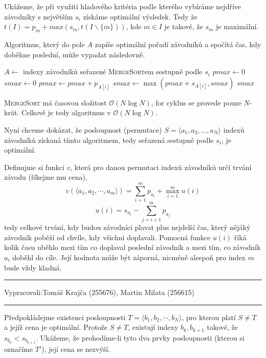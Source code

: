 \documentclass[12pt]{article}
\newcommand{\la}{\leftarrow}
\renewcommand{\O}{\mathcal{O}}
\newcommand{\zadani}[2]{
{\large
\noindent {\bf IB108 \hfill{} Sada #1, Příklad #2 \\[-4mm]}
\noindent\hrule
\vspace{2mm}
\noindent Vypracovali:\hfill{}Tomáš Krajča (255676), Martin Milata (256615)
\vspace{3mm}
\hrule
\bigskip\bigskip}
}
\begin{document}
Ukážeme, že při využití hladového kritéria podle kterého vybíráme nejdříve závodníky s největším
$s_i$ získáme optimální výsledek. Tedy že $t(I) = p_m + max(s_m, t(I \smallsetminus \{m\}))$, kde $m
\in I$ je takové, že $s_m$ je maximální.

Algoritmus, který do pole $A$ zapíše optimální pořadí závodníků a spočítá čas, kdy doběhne poslední,
může vypadat následovně.

\begin{algorithm}
\begin{algorithmic}
\STATE $A \la$ indexy závodníků seřazené \textsc{MergeSort}em sestupně podle $s_i$
\STATE $pmax \la 0$
\STATE $smax \la 0$
\FOR{$i \la 1 $ to $N$}
\STATE $pmax \la pmax + p_{A[i]}$
\STATE $smax \la \max(pmax+s_{A[i]},smax)$
\ENDFOR
\RETURN $smax$
\end{algorithmic}
\end{algorithm}

\noindent
\textsc{MergeSort} má časovou složitost $\O(N\log N)$, for cyklus se provede pouze $N$-krát.
Celkově je tedy algoritmus v $\O(N\log N)$.

\bigskip

\noindent
Nyní chceme dokázat, že posloupnost (permutace) $S = \langle a_1,a_2,...,a_N \rangle$ indexů
závodníků získaná tímto algoritmem, tedy seřazená sestupně podle $s_i$, je optimální.

Definujme si funkci $v$, která pro danou permutaci indexů závodníků určí trvání závodu (říkejme mu cena),
$$ v(\langle a_1,a_2,\cdots,a_m \rangle) = \sum_{i=1}^m p_{a_i} + \max_{i=1}^m u(i)$$
$$ u(i) = s_{a_i} - \sum_{j=i+1}^m p_{a_j}$$
tedy celkové trvání, kdy budou závodníci plavat plus nejdelší čas, který nějáký závodník poběží od
chvíle, kdy všichni doplavali. Pomocná funkce $u(i)$ říká kolik času uběhlo mezi tím co doplaval
poslední závodník a mezi tím, co závodník $a_i$ doběhl do cíle. Její hodnota může být záporná,
nicméně alespoň pro index $m$ bude vždy kladná.

\clearpage
\zadani{2}{2}

\noindent
Předpokládejme existenci posloupnosti $T = \langle b_1,b_2,\cdots,b_N \rangle$, pro kterou platí $S
\neq T$ a jejíž cena je optimální. Protože $S \neq T$, existují indexy $b_k, b_{k+1}$ takové, že
$s_{b_k} < s_{b_{k+1}}$. Ukážeme, že prohodíme-li tyto dva prvky posloupnosti (kterou si označíme
$T'$), její cena se nezvýší.
\end{document}
